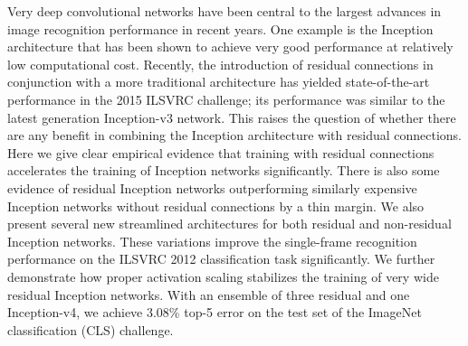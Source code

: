 Very deep convolutional networks have been central to the largest advances in image
recognition performance in recent years. One example is the Inception
architecture that has been shown to achieve very good performance at relatively
low computational cost. Recently, the introduction of residual connections
in conjunction with a more traditional architecture has yielded state-of-the-art
performance in the 2015 ILSVRC challenge; its performance was similar
to the latest generation Inception-v3 network. This raises the question of whether
there are any benefit in combining the Inception architecture with residual
connections.
Here we give clear empirical evidence that training with residual connections
accelerates the training of Inception networks significantly. There is also
some evidence of residual Inception networks outperforming similarly
expensive Inception networks without residual connections by a thin margin.
We also present several new streamlined architectures for both residual and
non-residual Inception networks. These variations improve the single-frame
recognition performance on the ILSVRC 2012 classification task significantly.
We further demonstrate how proper activation scaling stabilizes the training of
very wide residual Inception networks. With an ensemble of three residual and
one Inception-v4, we achieve 3.08\% top-5 error on the test set of
the ImageNet classification (CLS) challenge.
